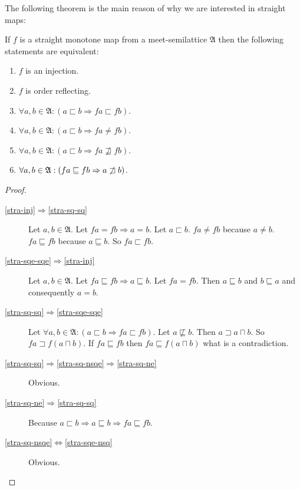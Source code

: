 The following theorem is the main reason of why we are interested in straight maps:
\begin{thm}
If $f$ is a straight monotone map from a meet-semilattice $\mathfrak{A}$
then the following statements are equivalent:
\begin{enumerate}
\item \label{stra-inj}$f$ is an injection.
\item \label{stra-sqe-sqe}$f$ is order reflecting.
\item \label{stra-sq-sq}$\forall a,b\in\mathfrak{A}:(a\sqsubset b\Rightarrow fa\sqsubset fb)$.
\item \label{stra-sq-ne}$\forall a,b\in\mathfrak{A}:(a\sqsubset b\Rightarrow fa\neq fb)$.
\item \label{stra-sq-nsqe}$\forall a,b\in\mathfrak{A}:(a\sqsubset b\Rightarrow fa\nsqsupseteq fb)$.
\item \label{stra-sqe-nsq}$\forall a,b\in\mathfrak{A}:(fa\sqsubseteq fb\Rightarrow a\not\sqsupset b)$.
\end{enumerate}
\end{thm}
\begin{proof}
~
\begin{description}
\item [{\ref{stra-inj}$\Rightarrow$\ref{stra-sq-sq}}] Let $a,b\in\mathfrak{A}$.
Let $fa=fb\Rightarrow a=b$. Let $a\sqsubset b$. $fa\neq fb$ because
$a\neq b$. $fa\sqsubseteq fb$ because $a\sqsubseteq b$. So $fa\sqsubset fb$.
\item [{\ref{stra-sqe-sqe}$\Rightarrow$\ref{stra-inj}}] Let $a,b\in\mathfrak{A}$.
Let $fa\sqsubseteq fb\Rightarrow a\sqsubseteq b$. Let $fa=fb$. Then
$a\sqsubseteq b$ and $b\sqsubseteq a$ and consequently $a=b$.
\item [{\ref{stra-sq-sq}$\Rightarrow$\ref{stra-sqe-sqe}}] Let $\forall a,b\in\mathfrak{A}:(a\sqsubset b\Rightarrow fa\sqsubset fb)$.
Let $a\nsqsubseteq b$. Then $a\sqsupset a\sqcap b$. So $fa\sqsupset f(a\sqcap b)$.
If $fa\sqsubseteq fb$ then $fa\sqsubseteq f(a\sqcap b)$ what is
a contradiction.
\item [{\ref{stra-sq-sq}$\Rightarrow$\ref{stra-sq-nsqe}$\Rightarrow$\ref{stra-sq-ne}}] Obvious.
\item [{\ref{stra-sq-ne}$\Rightarrow$\ref{stra-sq-sq}}] Because $a\sqsubset b\Rightarrow a\sqsubseteq b\Rightarrow fa\sqsubseteq fb$.
\item [{\ref{stra-sq-nsqe}$\Leftrightarrow$\ref{stra-sqe-nsq}}] Obvious.
\end{description}
\end{proof}


